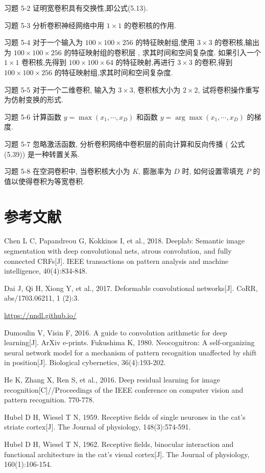 \documentclass[10pt]{article}
\begin{document}
习题 5-2 证明宽卷积具有交换性,即公式(5.13).

习题 5-3 分析卷积神经网络中用 $1 \times 1$ 的卷积核的作用.

习题 5-4 对于一个输入为 $100 \times 100 \times 256$ 的特征映射组,使用 $3 \times 3$ 的卷积核,输出为 $100 \times 100 \times 256$ 的特征映射组的卷积层 , 求其时间和空间复杂度. 如果引入一个 $1 \times 1$ 卷积核,先得到 $100 \times 100 \times 64$ 的特征映射,再进行 $3 \times 3$ 的卷积,得到 $100 \times 100 \times 256$ 的特征映射组,求其时间和空间复杂度.

习题 5-5 对于一个二维卷积, 输入为 $3 \times 3$, 卷积核大小为 $2 \times 2$, 试将卷积操作重写为仿射变换的形式.

习题 5-6 计算函数 $y=\max \left(x_{1}, \cdots, x_{D}\right)$ 和函数 $y=\arg \max \left(x_{1}, \cdots, x_{D}\right)$ 的梯度.

习题 5-7 忽略激活函数, 分析卷积网络中卷积层的前向计算和反向传播 ( 公式 (5.39)) 是一种转置关系.

习题 5-8 在空洞卷积中, 当卷积核大小为 $K$, 膨胀率为 $D$ 时, 如何设置零填充 $P$ 的值以使得卷积为等宽卷积.

\section*{参考文献}
Chen L C, Papandreou G, Kokkinos I, et al., 2018. Deeplab: Semantic image segmentation with deep convolutional nets, atrous convolution, and fully connected CRFs[J]. IEEE transactions on pattern analysis and machine intelligence, 40(4):834-848.

Dai J, Qi H, Xiong Y, et al., 2017. Deformable convolutional networks[J]. CoRR, abs/1703.06211, 1 (2):3.

\href{https://nndl.github.io/}{https://nndl.github.io/}

Dumoulin V, Visin F, 2016. A guide to convolution arithmetic for deep learning[J]. ArXiv e-prints. Fukushima K, 1980. Neocognitron: A self-organizing neural network model for a mechanism of pattern recognition unaffected by shift in position[J]. Biological cybernetics, 36(4):193-202.

He K, Zhang X, Ren S, et al., 2016. Deep residual learning for image recognition[C]//Proceedings of the IEEE conference on computer vision and pattern recognition. 770-778.

Hubel D H, Wiesel T N, 1959. Receptive fields of single neurones in the cat's striate cortex[J]. The Journal of physiology, 148(3):574-591.

Hubel D H, Wiesel T N, 1962. Receptive fields, binocular interaction and functional architecture in the cat's visual cortex[J]. The Journal of physiology, 160(1):106-154.
\end{document}
